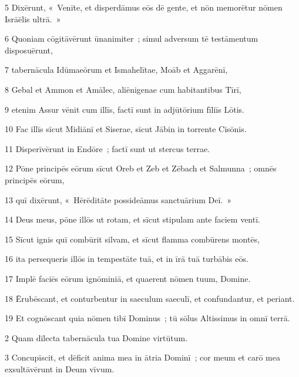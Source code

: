 \psalmVerse
  {\phantom{00}5}
  {Dixērunt, «~Venīte, et disperdāmus eōs dē gente, et nōn memorētur nōmen Isrāēlis ultrā.~»}


\psalmVerse
  {\phantom{00}6}
  {Quoniam cōgitāvērunt ūnanimiter~; simul adversum tē testāmentum disposuērunt,}


\psalmVerse
  {\phantom{00}7}
  {tabernācula Idūmaeōrum et Ismahelītae, Moāb et Aggarēnī,}


\psalmVerse
  {\phantom{00}8}
  {Gebal et Ammon et Amālec, aliēnigenae cum habitantibus Tīrī,}


\psalmVerse
  {\phantom{00}9}
  {etenim Assur vēnit cum illīs, factī sunt in adjūtōrium fīliīs Lōtis.}


\psalmVerse
  {\phantom{0}10}
  {Fac illīs sīcut Midiānī et Siserae, sīcut Jābin in torrente Cīsōnis.}


\psalmVerse
  {\phantom{0}11}
  {Disperīvērunt in Endōre~; factī sunt ut stercus terrae.}


\psalmVerse
  {\phantom{0}12}
  {Pōne principēs eōrum sīcut Oreb et Zeb et Zēbach et Salmunna~; omnēs principēs eōrum,}


\psalmVerse
  {\phantom{0}13}
  {quī dixērunt, «~Hērēditāte possideāmus sanctuārium Deī.~»}


\psalmVerse
  {\phantom{0}14}
  {Deus meus, pōne illōs ut rotam, et sīcut stipulam ante faciem ventī.}


\psalmVerse
  {\phantom{0}15}
  {Sīcut ignis quī combūrit silvam, et sīcut flamma combūrens montēs,}


\psalmVerse
  {\phantom{0}16}
  {ita persequeris illōs in tempestāte tuā, et in īrā tuā turbābis eōs.}


\psalmVerse
  {\phantom{0}17}
  {Implē faciēs eōrum ignōminiā, et quaerent nōmen tuum, Domine.}


\psalmVerse
  {\phantom{0}18}
  {Ērubēscant, et conturbentur in saeculum saeculī, et confundantur, et periant.}


\psalmVerse
  {\phantom{0}19}
  {Et cognōscant quia nōmen tibī Dominus~; tū sōlus Altissimus in omnī terrā.}



\psalmVerse
  {\phantom{00}2}
  {Quam dīlecta tabernācula tua Domine virtūtum.}


\psalmVerse
  {\phantom{00}3}
  {Concupīscit, et dēficit anima mea in ātria Dominī~; cor meum et carō mea exsultāvērunt in Deum vīvum.}


